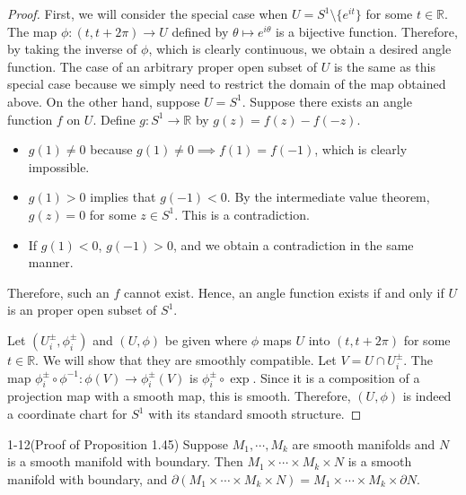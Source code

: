 \begin{proof}
  First, we will consider the special case when $U = S^1 \setminus \{ e^{it} \}$ for some $t \in \mathbb{R}$.
  The map $\phi: (t, t + 2\pi) \rightarrow U$ defined by $\theta \mapsto e^{i\theta}$ is a bijective function.
  Therefore, by taking the inverse of $\phi$, which is clearly continuous, we obtain a desired angle function.
  The case of an arbitrary proper open subset of $U$ is the same as this special case because we simply need to restrict the domain of the map obtained above.
  On the other hand, suppose $U = S^1$.
  Suppose there exists an angle function $f$ on $U$.
  Define $g: S^1 \rightarrow \mathbb{R}$ by $g(z) = f(z) - f(-z)$.
  \begin{itemize}
    \item
      $g(1) \ne 0$ because $g(1) \ne 0 \implies f(1) = f(-1)$, which is clearly impossible.
    \item
      $g(1) > 0$ implies that $g(-1) < 0$.
      By the intermediate value theorem, $g(z) = 0$ for some $z \in S^1$.
      This is a contradiction.
    \item
      If $g(1) < 0$, $g(-1) > 0$, and we obtain a contradiction in the same manner.
  \end{itemize}
  Therefore, such an $f$ cannot exist.
  Hence, an angle function exists if and only if $U$ is an proper open subset of $S^1$.

  Let $(U_i^{\pm}, \phi_i^{\pm})$ and $(U, \phi)$ be given where $\phi$ maps $U$ into $(t, t + 2\pi)$ for some $t \in \mathbb{R}$.
  We will show that they are smoothly compatible.
  Let $V = U \cap U_i^{\pm}$.
  The map $\phi_i^{\pm} \circ \phi^{-1}: \phi(V) \rightarrow \phi_i^{\pm}(V)$ is $\phi_i^{\pm} \circ \exp$.
  Since it is a composition of a projection map with a smooth map, this is smooth.
  Therefore, $(U, \phi)$ is indeed a coordinate chart for $S^1$ with its standard smooth structure.
\end{proof}

\begin{customprob}{1-12(Proof of Proposition 1.45)}
  Suppose $M_1, \cdots, M_k$ are smooth manifolds and $N$ is a smooth manifold with boundary.
  Then $M_1 \times \cdots \times M_k \times N$ is a smooth manifold with boundary, and $\partial (M_1 \times \cdots \times M_k \times N) = M_1 \times \cdots \times M_k \times \partial N$.
\end{customprob}

